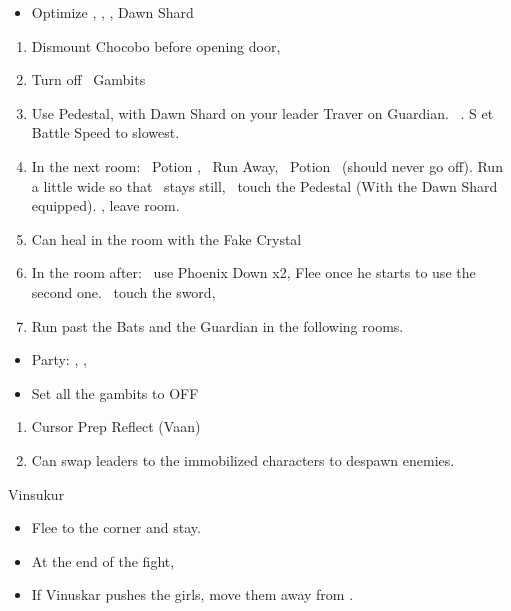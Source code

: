 \begin{equip}
	\begin{itemize}
		\item Optimize \vaan, \penelo, \ashe, \basch
		      \baschf Dawn Shard
	\end{itemize}
\end{equip}
\begin{enumerate}[resume]
	\item Dismount Chocobo before opening door, \leader{\basch}
	\item Turn off \basch\ Gambits
	\item Use Pedestal, with Dawn Shard on your leader
	      \vaanf Traver on Guardian. \basch\ . \travelercheck S et Battle Speed to slowest.
	\item In the next room: \vaan\ Potion \vaan, \basch\ Run Away, \vaan\ Potion \basch\ (should never go off). Run a little wide so that \vaan\ stays still, \basch\ touch the Pedestal (With the Dawn Shard equipped). \leader{\vaan}, leave room.
	\item Can heal in the room with the Fake Crystal
	\item In the room after: \basch\ use Phoenix Down x2, Flee once he starts to use the second one. \vaan\ touch the sword, \leader{\basch}
	\item Run past the Bats and the Guardian in the following rooms.
\end{enumerate}
\begin{menu}
	\begin{itemize}
		\item Party: \vaan, \ashe, \penelo
		      \battlefast
	\end{itemize}
\end{menu}
\begin{gambit}
	\begin{itemize}

		\vaanf \textbf{OFF}
		\item Set all the gambits to OFF %
	\end{itemize}
\end{gambit}
\begin{enumerate}[resume]
	\ashef Blizzara \penelo
	\penelof Immobilize \ashe
	\item Cursor	Prep Reflect (Vaan)
	\item Can swap leaders to the immobilized characters to despawn enemies.
\end{enumerate}
\begin{battle}{Vinsukur}
	\begin{itemize}
		\vaanf Reflect \ashe, \penelo\ at the stairs.
		\item \GirlsGambitOn
		      \vaanf Flee to the corner and stay.
		\item At the end of the fight, \GirlsGambitOff
		\item If Vinuskar pushes the girls, move them away from \vaan.
	\end{itemize}
\end{battle}

